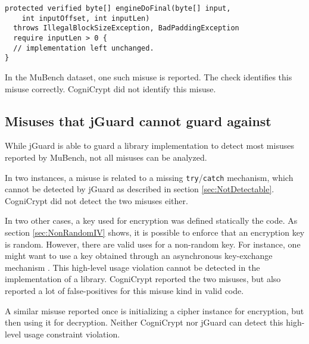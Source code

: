 \documentclass{article}
\begin{document}
\begin{lstlisting}[style=jGuard]
protected verified byte[] engineDoFinal(byte[] input,
    int inputOffset, int inputLen)
  throws IllegalBlockSizeException, BadPaddingException
  require inputLen > 0 {
  // implementation left unchanged.
}
\end{lstlisting}

In the MuBench dataset, one such misuse is reported.
The check identifies this misuse correctly.
CogniCrypt did not identify this misuse.

\subsection{Misuses that jGuard cannot guard against}

While jGuard is able to guard a library implementation to detect most misuses reported by MuBench,
not all misuses can be analyzed.

In two instances, a misuse is related to a missing \texttt{try}/\texttt{catch} mechanism,
which cannot be detected by jGuard as described in section \ref{sec:NotDetectable}.
CogniCrypt did not detect the two misuses either.

In two other cases, a key used for encryption was defined statically the code.
As section \ref{sec:NonRandomIV} shows, it is possible to enforce that an encryption key
is random.
However, there are valid uses for a non-random key. For instance, one might want to use a key obtained
through an asynchronous key-exchange mechanism \cite{keyexchange}.
This high-level usage violation cannot be detected in the implementation of a library.
CogniCrypt reported the two misuses, but also reported a lot of false-positives for
this misuse kind in valid code.

A similar misuse reported once is initializing a cipher instance for encryption, but then using it for
decryption.
Neither CogniCrypt nor jGuard can detect this high-level usage constraint violation.
\end{document}
